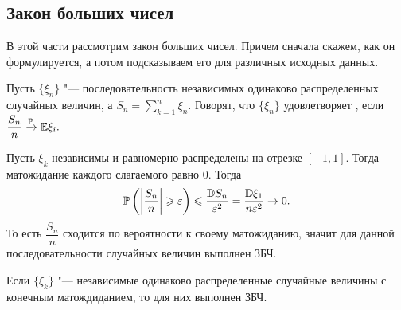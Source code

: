 \documentclass[../TV&MS.tex]{subfiles}
\begin{document}
\subsection{Закон больших чисел}
	В этой части рассмотрим закон больших чисел. Причем сначала скажем, как он 
	формулируется, а потом подсказываем его для различных исходных данных.

\begin{Def}
    Пусть $\{\xi_n\}$ "--- последовательность независимых одинаково распределенных 
    случайных величин, а $S_n = \sum\limits_{k=1}^{n} \xi_n$. Говорят, что 
    $\{\xi_n\}$ удовлетворяет , если 
    $\dfrac{S_n}{n} \xrightarrow[]{\mathbb{P}} \mathbb{E} \xi_i.$ 
\end{Def} 

\begin{Ex}
    Пусть $\xi_k$ независимы и равномерно распределены на отрезке $[-1, 1]$. 
    Тогда матожидание каждого слагаемого равно $0$. Тогда
\[
    \mathbb{P} \left( \left| \dfrac{S_n}{n} \right| \geqslant \varepsilon \right) 
    \leqslant \dfrac{\mathbb{D} S_n}{\varepsilon^2} = 
    \dfrac{\mathbb{D} \xi_1}{n \varepsilon^2} \rightarrow 0. 
\]
    То есть $\dfrac{S_n}{n}$ сходится по вероятности к своему матожиданию, 
    значит для данной последовательности случайных величин выполнен ЗБЧ.
\end{Ex} 

\begin{Th}
    Если $\{ \xi_k \}$ "--- независимые одинаково распределенные случайные величины 
    с конечным матождиданием, то для них выполнен ЗБЧ. 
\end{Th} 
\end{document}
